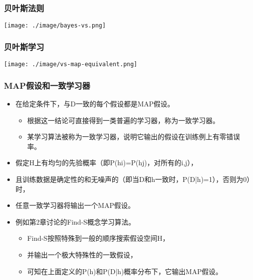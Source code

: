 \documentclass{beamer}
\begin{document}
\begin{frame}
\frametitle{贝叶斯法则}
\label{sec-3-4}

\texttt{[image: ./image/bayes-vs.png]}
\end{frame}
\begin{frame}
\frametitle{贝叶斯学习}
\label{sec-3-5}


\texttt{[image: ./image/vs-map-equivalent.png]}
\end{frame}
\begin{frame}
\frametitle{MAP假设和一致学习器}
\label{sec-3-6}

\begin{itemize}
\item 在给定条件下，与D一致的每个假设都是MAP假设。
\begin{itemize}
\item 根据这一结论可直接得到一类普遍的学习器，称为一致学习器。
\item 某学习算法被称为一致学习器，说明它输出的假设在训练例上有零错误率。
\end{itemize}
\item 假定H上有均匀的先验概率（即P(hi)=P(hj)，对所有的i,j），
\item 且训练数据是确定性的和无噪声的（即当D和h一致时，P(D|h)=1），否则为0）时，
\item 任意一致学习器将输出一个MAP假设。
\item 例如第2章讨论的Find-S概念学习算法。
\begin{itemize}
\item Find-S按照特殊到一般的顺序搜索假设空间H，
\item 并输出一个极大特殊性的一致假设，
\item 可知在上面定义的P(h)和P(D|h)概率分布下，它输出MAP假设。
\end{itemize}
\end{itemize}
\end{frame}
\end{document}
